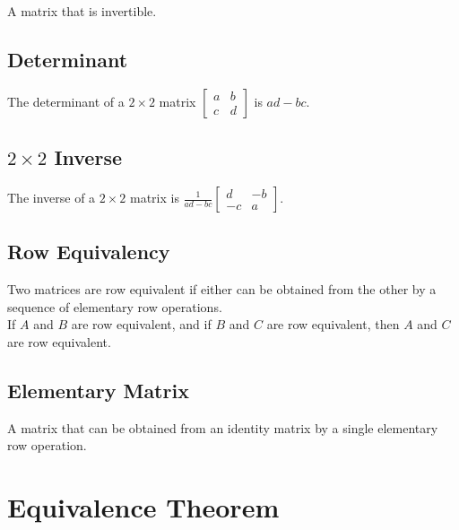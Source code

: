 \documentclass[12pt]{article}
\begin{document}
A matrix that is invertible.


\subsection{Determinant}

The determinant of a $2\times2$ matrix $\begin{bmatrix}a&b\\c&d\end{bmatrix}$ is $ad - bc$.


\subsection{$2\times2$ Inverse}

The inverse of a $2\times2$ matrix is $\displaystyle\frac{1}{ad - bc} \begin{bmatrix}d&-b\\-c&a\end{bmatrix}$.


\subsection{Row Equivalency}

Two matrices are row equivalent if either can be obtained from the other by a sequence of elementary row operations.\\
If $A$ and $B$ are row equivalent, and if $B$ and $C$ are row equivalent, then $A$ and $C$ are row equivalent.


\subsection{Elementary Matrix}

A matrix that can be obtained from an identity matrix by a single elementary row operation.


\section{Equivalence Theorem}
\end{document}
